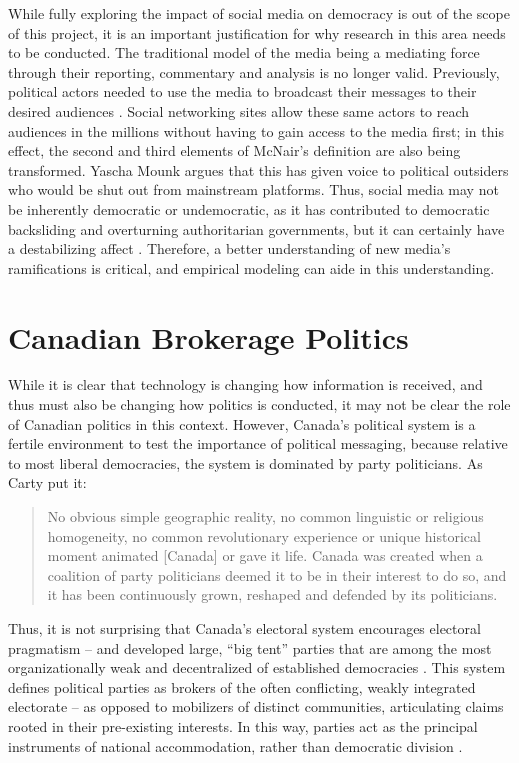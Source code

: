 While fully exploring the impact of social media on democracy is out of the
scope of this project, it is an important justification for why research in this
area needs to be conducted. The traditional model of the media being a mediating
force through their reporting, commentary and analysis is no longer valid.
Previously, political actors needed to use the media to broadcast their messages
to their desired audiences \cite{mcnair2017introduction}. Social networking
sites allow these same actors to reach audiences in the millions without having
to gain access to the media first; in this effect, the second and third elements
of McNair’s definition are also being transformed. Yascha Mounk argues that this
has given voice to political outsiders who would be shut out from mainstream
platforms. Thus, social media may not be inherently democratic or undemocratic,
as it has contributed to democratic backsliding and overturning authoritarian
governments, but it can certainly have a destabilizing affect
\cite{mounk2018people}. Therefore, a better understanding of new media’s
ramifications is critical, and empirical modeling can aide in this
understanding.

\section{Canadian Brokerage Politics}

While it is clear that technology is changing how information is received, and
thus must also be changing how politics is conducted, it may not be clear the
role of Canadian politics in this context. However, Canada’s political system
is a fertile environment to test the importance of political messaging, because
relative to most liberal democracies, the system is dominated by party
politicians. As Carty put it:

\begin{quote}
No obvious simple geographic reality, no common linguistic or religious
homogeneity, no common revolutionary experience or unique historical moment
animated [Canada] or gave it life. Canada was created when a coalition of party
politicians deemed it to be in their interest to do so, and it has been
continuously grown, reshaped and defended by its politicians.
\cite{carty2010political}
\end{quote}

Thus, it is not surprising that Canada’s electoral system encourages electoral
pragmatism -- and developed large, “big tent” parties that are among the most
organizationally weak and decentralized of established democracies
\cite{carty2010political}. This system defines political parties as brokers of
the often conflicting, weakly integrated electorate -- as opposed to mobilizers
of distinct communities, articulating claims rooted in their pre-existing
interests. In this way, parties act as the principal instruments of national
accommodation, rather than democratic division \cite{carty2010political}.

